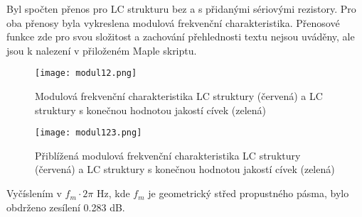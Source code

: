 \noindent Byl spočten přenos pro LC strukturu bez a s přidanými sériovými rezistory. Pro oba přenosy byla vykreslena modulová frekvenční charakteristika. Přenosové funkce zde pro svou složitost a zachování přehlednosti textu nejsou uváděny, ale jsou k nalezení v přiloženém Maple skriptu.
\begin{figure}[h]
\centering
\texttt{[image: modul12.png]}
\caption{Modulová frekvenční charakteristika LC struktury (červená) a LC struktury s konečnou hodnotou jakostí cívek (zelená)}
\end{figure}
\begin{figure}[h]
\centering
\texttt{[image: modul123.png]}
\caption{Přiblížená modulová frekvenční charakteristika LC struktury (červená) a LC struktury s konečnou hodnotou jakostí cívek (zelená)}
\end{figure}
\noindent Vyčíslením v $f_m \cdot 2 \pi$ Hz, kde $f_m$ je geometrický střed propustného pásma, bylo obdrženo zesílení 0.283 dB.\\
\\
